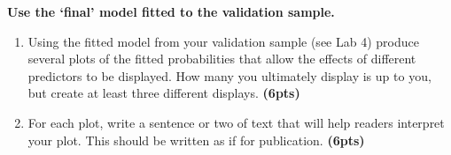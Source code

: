 \documentclass[]{article}\usepackage[]{graphicx}\usepackage[]{color}
\begin{document}
\vspace{\baselineskip}
\noindent\textbf{Use the `final' model fitted to the validation sample.}

\begin{enumerate}[resume]
\item Using the fitted model from your validation sample (see Lab 4) produce several plots of the fitted probabilities that allow the effects of different predictors to be displayed. How many you ultimately display is up to you, but create at least three different displays. \textbf{(6pts)}
\item For each plot, write a sentence or two of text that will help readers interpret your plot. This should be written as if for publication. \textbf{(6pts)}
\end{enumerate}
\end{document}
